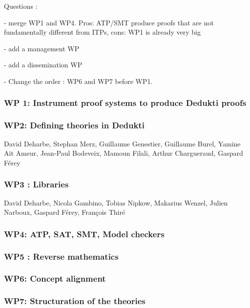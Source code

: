 {\color{red}

Questions :

- merge WP1 and WP4. Pros: ATP/SMT produce proofs that are not fundamentally
different from ITPs, cons: WP1 is already very big

- add a management WP

- add a dissemination WP

- Change the order : WP6 and WP7 before WP1.  
}


\subsubsection{WP 1: Instrument proof systems to produce Dedukti proofs}



\subsubsection{WP2: Defining theories in Dedukti}

David Deharbe, Stephan Merz, Guillaume Genestier, Guillaume
Burel, Yamine Ait Ameur, Jean-Paul Bodeveix, Mamoun Filali, Arthur
Chargueraud, Gaspard Férey



\subsubsection{WP3 : Libraries}

David Deharbe, Nicola Gambino, Tobias Nipkow, Makarius Wenzel,
Julien Narboux, Gaspard Férey, François Thiré



\subsubsection{WP4: ATP, SAT, SMT, Model checkers}



\subsubsection{WP5 : Reverse mathematics}



\subsubsection{WP6: Concept alignment}



\subsubsection{WP7: Structuration of the theories}




